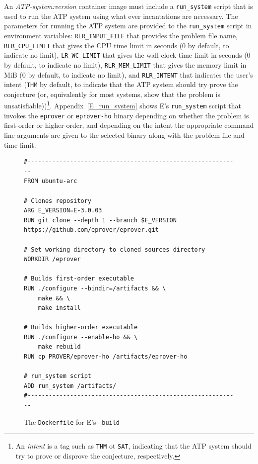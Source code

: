 \documentclass{easychair}
\begin{document}
An {\em ATP-system:version} container image must include a {\tt run\_system} script that is used 
to run the ATP system using what ever incantations are necessary.
The parameters for running the ATP system are provided to the {\tt run\_system} script in 
environment variables:
{\tt RLR\_INPUT\_FILE} that provides the problem file name,
{\tt RLR\_CPU\_LIMIT} that gives the CPU time limit in seconds (0 by default, to indicate no limit),
{\tt LR\_WC\_LIMIT} that gives the wall clock time limit in seconds (0 by default, to indicate no 
limit),
{\tt RLR\_MEM\_LIMIT} that gives the memory limit in MiB (0 by default, to indicate no limit),
and
{\tt RLR\_INTENT} that indicates the user's intent ({\tt THM} by default, to indicate that the ATP
system should try prove the conjecture (or, equivalently for most systems, show that the problem 
is unsatisfiable))\footnote{%
An {\em intent} is a tag such as {\tt THM} ot {\tt SAT}, indicating that the ATP system should
try to prove or disprove the conjecture, respectively.}.
Appendix~\ref{E_run_system} shows E's {\tt run\_system} script that invokes the {\tt eprover} 
or {\tt eprover-ho} binary depending on whether the problem is first-order or higher-order, 
and depending on the intent the appropriate command line arguments are given to the selected 
binary along with the problem file and time limit. 

\begin{figure}[htb]
{\small
\begin{verbatim}
#------------------------------------------------------------
FROM ubuntu-arc

# Clones repository
ARG E_VERSION=E-3.0.03
RUN git clone --depth 1 --branch $E_VERSION https://github.com/eprover/eprover.git

# Set working directory to cloned sources directory
WORKDIR /eprover

# Builds first-order executable
RUN ./configure --bindir=/artifacts && \
    make && \
    make install

# Builds higher-order executable
RUN ./configure --enable-ho && \
    make rebuild
RUN cp PROVER/eprover-ho /artifacts/eprover-ho

# run_system script
ADD run_system /artifacts/
#------------------------------------------------------------
\end{verbatim}
}
\caption{The {\tt Dockerfile} for E's {\tt -build}}
\label{E---build}
\end{figure}
\end{document}
